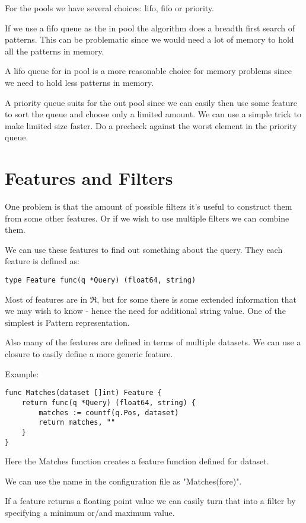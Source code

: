 For the pools we have several choices: lifo, fifo or priority.

If we use a fifo queue as the in pool the algorithm does a breadth first search of patterns. This can be problematic since we would need a lot of memory to hold all the patterns in memory.

A lifo queue for in pool is a more reasonable choice for memory problems since we need to hold less patterns in memory.

A priority queue suits for the out pool since we can easily then use some feature to sort the queue and choose only a limited amount. We can use a simple trick to make limited size faster. Do a precheck against the worst element in the priority queue.

\section{Features and Filters}

One problem is that the amount of possible filters it's useful to construct them from some other features. Or if we wish to use multiple filters we can combine them.

We can use these features to find out something about the query.
They each feature is defined as:

\begin{verbatim}
type Feature func(q *Query) (float64, string)
\end{verbatim}

Most of features are in $\Re$, but for some there
is some extended information that we may wish to know - hence
the need for additional string value. One of the simplest
is Pattern representation.

Also many of the features are defined in terms of multiple datasets.
We can use a closure to easily define a more generic feature.

Example:

\begin{verbatim}
func Matches(dataset []int) Feature {
	return func(q *Query) (float64, string) {
		matches := countf(q.Pos, dataset)
		return matches, ""
	}
}
\end{verbatim}

Here the Matches function creates a feature function defined
for dataset.

We can use the name in the configuration file as "Matches(fore)".

If a feature returns a floating point value we can easily turn that
into a filter by specifying a minimum or/and maximum value.

